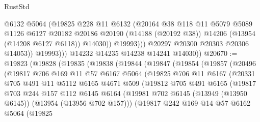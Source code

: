 \begin{lexlean}{RustStd}
\begin{coremodule}
                        @6132
                        @5064
                        (@19825
                          @228
                          @11
                          @6132
                          (@20164
                            @38
                            @118
                            @11
                            @5079
                            @5089
                            @1126
                            @6127
                            @20182
                            @20186
                            @20190
                            (@14188 (@20192 @38))
                            @14206
                            (@13954 (@14208 @6127 @6118))
                            @14030))
                        @19993)))
                  @20297
                  @20300
                  @20303
                  @20306
                  @14053))
              @19993)))
        @14232
        @14235
        @14238
        @14241
        @14030))
@20670 := @19823
    (@19828
      (@19835
        (@19838
          (@19844
            (@19847
              (@19854
                (@19857
                  (@20496
                    (@19817
                      @706
                      @169
                      @11
                      @57
                      @6167
                      @5064
                      (@19825
                        @706
                        @11
                        @6167
                        (@20331
                          @705
                          @491
                          @11
                          @5112
                          @6165
                          @4671
                          @509
                          (@19812
                            @705
                            @491
                            @6165
                            (@19817
                              @703
                              @244
                              @157
                              @112
                              @6145
                              @6164
                              (@19981
                                @702
                                @6145
                                (@13949 (@13950 @6145))
                                (@13954 (@13956 @702 @157)))
                              (@19817
                                @242
                                @169
                                @14
                                @57
                                @6162
                                @5064
                                (@19825

\end{coremodule}
\end{lexlean}
